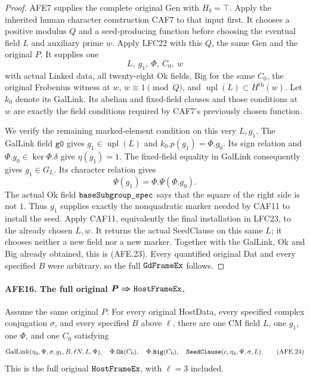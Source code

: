 \documentclass[11pt,a4paper]{article}
\numberwithin{equation}{section}
\theoremstyle{remark}\newtheorem{remark}[theorem]{Remark}
\begin{document}
\begin{proof}
AFE7 supplies the complete original Gen with \(H_b=\top\).
Apply the inherited human character construction CAF7
to that input first.  It chooses a positive modulus
\(Q\) and a seed-producing function before choosing
the eventual field \(L\) and auxiliary prime \(w\).
Apply LFC22 with this \(Q\), the same Gen and the
original \(P\).  It supplies one
\[
               L,\ g_1,\ \Phi,\ C_0,\ w
 \]
with actual Linked data, all twenty-eight Ok fields,
Big for the same \(C_0\), the original Frobenius
witness at \(w\), \(w\equiv1\pmod Q\), and
\(\operatorname{upl}(L)\subset H^{\mathrm{th}}(w)\).
Let \(k_0\) denote its GalLink.
Its abelian and fixed-field clauses and those
conditions at \(w\) are exactly the field conditions
required by CAF7's previously chosen function.

We verify the remaining marked-element condition
on this very \(L,g_1\).
The GalLink field \(\texttt{g0}\) gives
\(g_1\in\operatorname{upl}(L)\) and
\(k_0.p(g_1)=\Phi.g_0\).
Its sign relation and \(\Phi.g_0\in\ker\Phi.\delta\)
give \(\eta(g_1)=1\).
The fixed-field equality in GalLink consequently
gives \(g_1\in G_L\).
Its character relation gives
\[
             \overline\Psi(g_1)=\Phi.\Psi(\Phi.g_0).
 \]
The actual Ok field \(\texttt{base\allowbreak Subgroup\_\allowbreak spec}\)
says that the square of the right side is not \(1\).
Thus \(g_1\) supplies exactly the nonquadratic marker
needed by CAF11 to install the seed.
Apply CAF11, equivalently the final installation in
LFC23, to the already chosen \(L,w\).
It returns the actual SeedClause on this same \(L\);
it chooses neither a new field nor a new marker.
Together with the GalLink, Ok and Big already
obtained, this is (AFE.23).
Every quantified original Dat and every specified
\(B\) were arbitrary, so the full \(\texttt{Gd\allowbreak Frame\allowbreak Ex}\)
follows.
\end{proof}

\paragraph{AFE16. The full original \(\boldsymbol{P\Rightarrow\texttt{Host\allowbreak Frame\allowbreak Ex}}\).}
\label{claim:AFE16}
Assume the same original \(P\).
For every original HostData, every specified complex
conjugation \(\sigma\), and every specified \(B\)
above \(\ell\), there are one CM field \(L\), one
\(g_1\), one \(\Phi\), and one \(C_0\) satisfying
\[
 \operatorname{GalLink}(\eta_4,\Psi,\sigma,g_1,B,\ell N,L,\Phi),
 \quad\Phi.\texttt{Ok}(C_0),\quad\Phi.\texttt{Big}(C_0),
 \quad\texttt{Seed\allowbreak Clause}(c,\eta_4,\Psi,\sigma,L).
                                                        \tag{AFE.24}
\]
This is the full original \(\texttt{Host\allowbreak Frame\allowbreak Ex}\),
with \(\ell=3\) included.
\end{document}
